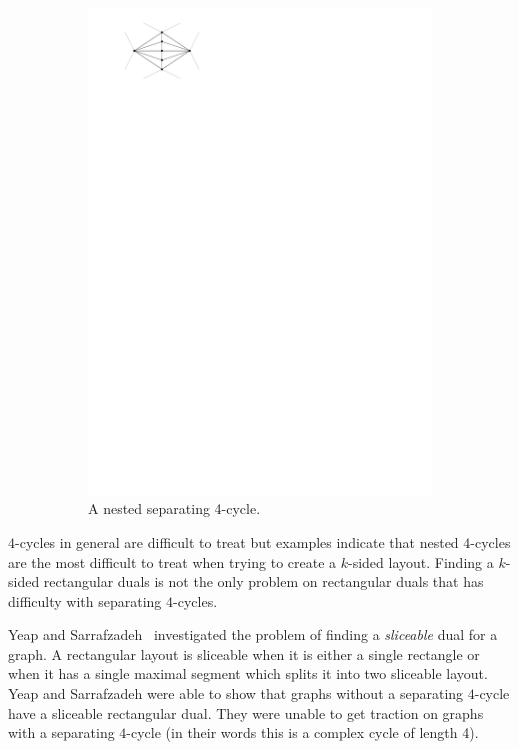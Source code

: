 \begin{figure}
\begin{subfigure}[b]{0.1 \textwidth}
          \includegraphics[width =\textwidth]{introduction/img/nest4cycle.pdf}
          \caption{A nested separating 4-cycle.}
      \end{subfigure}
    \caption{}
    \label{fig:intro:4cycle}
  \end{figure}


  $4$-cycles in general are difficult to treat but examples indicate that nested $4$-cycles are the most difficult to treat when trying to create a $k$-sided layout.
  Finding a $k$-sided rectangular duals is not the only problem on rectangular duals that has difficulty with separating $4$-cycles.

  Yeap and Sarrafzadeh~\cite{Yeap1995} investigated the problem of finding a \emph{sliceable} dual for a graph. A rectangular layout is sliceable when it is either a single rectangle or when it has a single maximal segment which splits it into two sliceable layout.
  Yeap and Sarrafzadeh were able to show that graphs without a separating $4$-cycle have a sliceable rectangular dual. They were unable to get traction on graphs with a separating $4$-cycle (in their words this is a complex cycle of length 4).

